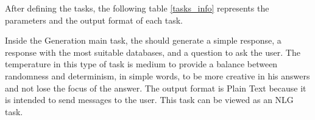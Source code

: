 After defining the tasks, the following table \ref{tasks_info} represents the parameters and the output format of each task.


\begin{table}[H]
  \centering
  \caption{LLM tasks parameters and output information.}
  \label{tasks_info}
\end{table}

Inside the Generation main task, the {\llm} should generate a simple response, a response with the most suitable databases, and a question to ask the user. The temperature in this type of task is medium to provide a balance between randomness and determinism, in simple words, to be more creative in his answers and not lose the focus of the answer. The output format is Plain Text because it is intended to send messages to the user. This task can be viewed as an NLG task.

